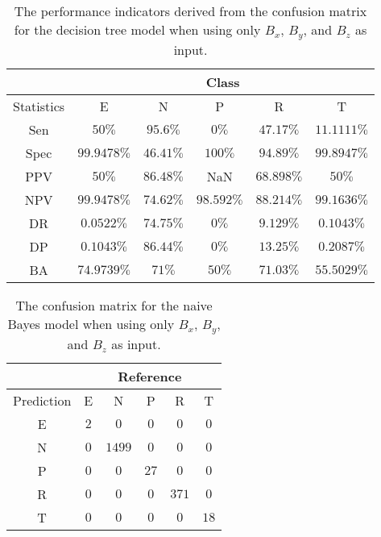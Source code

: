 \begin{table}[!ht]
	\centering
	\begin{tabular}{|c|c|c|c|c|c|}
		\hline
		 & \multicolumn{5}{c|}{Class} \\ \hline
		Statistics & E & N & P & R & T \\ \hline
		Sen & $50\%$ & $95.6\%$ & $0\%$ & $47.17\%$ & $11.1111\%$ \\ \hline
		Spec & $99.9478\%$ & $46.41\%$ & $100\%$ & $94.89\%$ & $99.8947\%$ \\ \hline
		PPV & $50\%$ & $86.48\%$ & NaN & $68.898\%$ & $50\%$ \\ \hline
		NPV & $99.9478\%$ & $74.62\%$ & $98.592\%$ & $88.214\%$ & $99.1636\%$ \\ \hline
		DR & $0.0522\%$ & $74.75\%$ & $0\%$ & $9.129\%$ & $0.1043\%$ \\ \hline
		DP & $0.1043\%$ & $86.44\%$ & $0\%$ & $13.25\%$ & $0.2087\%$ \\ \hline
		BA & $74.9739\%$ & $71\%$ & $50\%$ & $71.03\%$ & $55.5029\%$ \\ \hline
	\end{tabular}
	\caption{The performance indicators derived from the confusion matrix for the decision tree model when using only $B_{x}$, $B_{y}$, and $B_{z}$ as input.}
	\label{tab:cs:reverse:coord:C5.0}
\end{table}

\begin{table}[!ht]
	\centering
	\begin{tabular}{|c|c|c|c|c|c|}
		\hline
		 & \multicolumn{5}{|c|}{Reference} \\ \hline
		 Prediction & E & N & P & R & T \\ \hline
		 E & $2$ & $0$ & $0$ & $0$ & $0$ \\ \hline
		 N & $0$ & $1499$ & $0$ & $0$ & $0$ \\ \hline
		 P & $0$ & $0$ & $27$ & $0$ & $0$ \\ \hline
		 R & $0$ & $0$ & $0$ & $371$ & $0$ \\ \hline
		 T & $0$ & $0$ & $0$ & $0$ & $18$ \\ \hline
	\end{tabular}
	\caption{The confusion matrix for the naive Bayes model when using only $B_{x}$, $B_{y}$, and $B_{z}$ as input.}
	\label{tab:cm:coord:nb}
\end{table}

